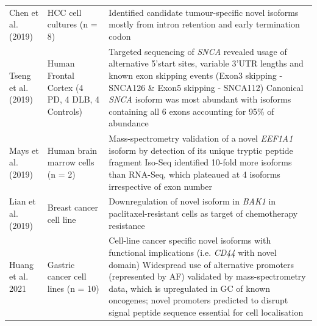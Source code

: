 \begin{changemargin}{1.5cm}
\begin{landscape}
\begin{longtable}[c]{p{4cm}p{4cm}p{18cm}}
			\centering Chen et al. (2019) \cite{Chen2019} &
			\centering HCC cell cultures (n = 8)  &
			\tabitem Identified candidate tumour-specific novel isoforms mostly from intron retention and early termination codon\\
			\hdashline[0.5pt/5pt]
			
			\centering Tseng et al. (2019) \cite{Tseng2019} &
			\centering Human Frontal Cortex \newline (4 PD, 4 DLB, 4 Controls)  &
			\tabitem Targeted sequencing of \textit{SNCA} revealed usage of alternative 5'start sites, variable 3'UTR lengths and known exon skipping events (Exon3 skipping - SNCA126 \& Exon5 skipping - SNCA112) \newline 
			\tabitem Canonical \textit{SNCA} isoform was most abundant with isoforms containing all 6 exons accounting for 95\% of abundance\\
			\hdashline[0.5pt/5pt]
			
			\centering Mays et al. (2019)\cite{DeslattesMays2019} &
			\centering Human brain marrow cells (n = 2)  &
			\tabitem  Mass-spectrometry validation of a novel \textit{EEF1A1} isoform by detection of its unique tryptic peptide fragment \newline 
			\tabitem Iso-Seq identified 10-fold more isoforms than RNA-Seq, which plateaued at 4 isoforms irrespective of exon number \\
			\hdashline[0.5pt/5pt]
			
			\centering Lian et al. (2019) \cite{Lian2019} &
			\centering Breast cancer cell line &
			\tabitem Downregulation of novel isoform in \textit{BAK1} in paclitaxel-resistant cells as target of chemotherapy resistance \\
			\hdashline[0.5pt/5pt]
			
			\centering Huang et al. 2021 \cite{Huang2021} &
			\centering Gastric cancer cell lines (n = 10) &
			\tabitem Cell-line cancer specific novel isoforms with functional implications (i.e. \textit{CD44} with novel domain) \newline
			\tabitem Widespread use of alternative promoters (represented by AF) validated by mass-spectrometry data, which is upregulated in GC of known oncogenes; novel promoters predicted to disrupt signal peptide sequence essential for cell localisation   \\* \bottomrule
		\end{longtable}
		

\end{landscape}
\end{changemargin}
